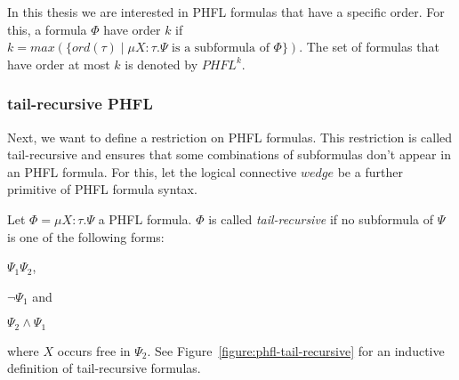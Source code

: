 In this thesis we are interested in PHFL formulas that have a specific order. For this, a formula $\Phi$ have order $k$
if $k = max(\{ord(\tau)\mid \mu X \colon \tau. \Psi \text{ is a subformula of } \Phi\})$. The set of formulas that have
order at most $k$ is denoted by $PHFL^k$.

\subsubsection{tail-recursive PHFL}

Next, we want to define a restriction on PHFL formulas. This restriction is called tail-recursive and ensures that
some combinations of subformulas don't appear in an PHFL formula. For this, let the logical connective $wedge$ be a
 further primitive of PHFL formula syntax.

\begin{definition}
    Let $\Phi = \mu X \colon \tau. \Psi$ a PHFL formula. $\Phi$ is called \emph{tail-recursive} if no subformula of
    $\Psi$ is one of the following forms:
    \begin{compactitem}
        \item $\Psi_1\Psi_2$,
        \item $\neg\Psi_1$ and
        \item $\Psi_2 \wedge \Psi_1$
    \end{compactitem}
    where $X$ occurs free in  $\Psi_2$. See Figure~\ref{figure:phfl-tail-recursive} for an inductive definition of
    tail-recursive formulas.
\end{definition}

